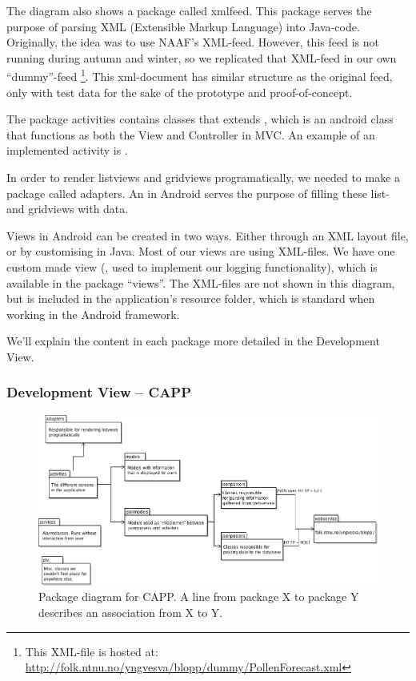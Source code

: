 The diagram also shows a package called xmlfeed. This package serves the purpose of parsing XML (Extensible Markup Language) into Java-code. Originally, the idea was to
use NAAF's XML-feed. However, this feed is not running during autumn and winter, so we replicated that XML-feed in our own
``dummy''-feed \footnote{This XML-file is hosted at: \url{http://folk.ntnu.no/yngvesva/blopp/dummy/PollenForecast.xml}}. 
This xml-document has similar structure as the original feed, only with test data for the sake of the prototype and proof-of-concept.

The package activities contains classes that extends , which is an android class that functions as both the View and Controller in MVC. 
An example of an implemented activity is .

In order to render listviews and gridviews programatically, we needed to make a package called adapters. An  in Android serves the purpose of filling  
these list- and gridviews with data.
 
Views in Android can be created in two ways. Either through an XML layout file, or by customising in Java. Most of our views are using XML-files. We have one custom
made view (, used to implement our logging functionality), which is available in the package ``views''. 
The XML-files are not shown in this diagram, but is included in the application's resource folder, which is standard when working
in the Android framework.  
  

We'll explain the content in each package more detailed in the Development View.

\subsubsection{Development View -- CAPP}
\begin{figure}
	\centering
		\includegraphics[width = 11.5 cm]{Pictures/ArchPictures/capparchpictures/capp_package_diagram}
	\caption[GAPP package diagram]{Package diagram for CAPP. A line from package X to package Y describes an association from X to Y. }

	\label{fig:package-diagram-system-capp}
\end{figure}

